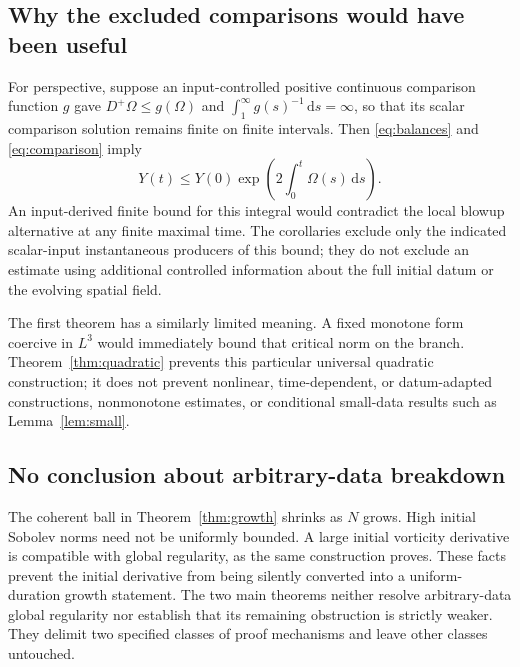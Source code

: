 \documentclass[11pt]{article}
\theoremstyle{remark}
\newcommand{\dd}{\,\mathrm d}
\begin{document}
\subsection{Why the excluded comparisons would have been useful}
For perspective, suppose an input-controlled positive continuous
comparison function $g$ gave $D^+\Omega\le g(\Omega)$ and
$\int_1^\infty g(s)^{-1}\dd s=\infty$, so that its scalar comparison
solution remains finite on finite intervals. Then
\eqref{eq:balances} and \eqref{eq:comparison} imply
\begin{equation}
 Y(t)\le Y(0)\exp\left(2\int_0^t\Omega(s)\dd s\right).
\end{equation}
An input-derived finite bound for this integral would contradict the local
blowup alternative at any finite maximal time. The corollaries exclude
only the indicated scalar-input instantaneous producers of this bound;
they do not exclude an estimate using additional controlled information
about the full initial datum or the evolving spatial field.

The first theorem has a similarly limited meaning. A fixed monotone form
coercive in $L^3$ would immediately bound that critical norm on the branch.
Theorem~\ref{thm:quadratic} prevents this particular universal quadratic
construction; it does not prevent nonlinear, time-dependent, or
datum-adapted constructions, nonmonotone estimates, or conditional
small-data results such as Lemma~\ref{lem:small}.

\subsection{No conclusion about arbitrary-data breakdown}
The coherent ball in Theorem~\ref{thm:growth} shrinks as $N$ grows. High
initial Sobolev norms need not be uniformly bounded. A large initial
vorticity derivative is compatible with global regularity, as the same
construction proves. These facts prevent the initial derivative from being
silently converted into a uniform-duration growth statement. The two main
theorems neither resolve arbitrary-data global regularity nor establish
that its remaining obstruction is strictly weaker. They delimit two
specified classes of proof mechanisms and leave other classes untouched.
\end{document}

